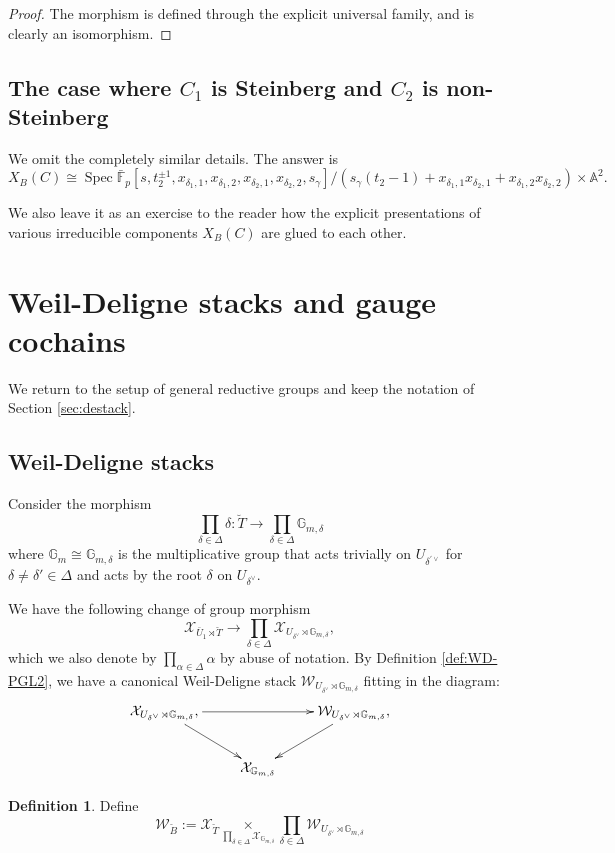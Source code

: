 \documentclass[11pt]{amsart}
\newcommand{\MINOREDITED}[1]{#1}
\theoremstyle{definition}
\newtheorem{defn}[thm]{Definition}
\newcommand{\G}{\mathbb{G}}
\newcommand{\A}{\mathbb{A}}
\newcommand{\bFp}{\bar{\mathbb{F}}_p}
\newcommand{\cX}{\mathcal{X}}
\newcommand{\cW}{\mathcal{W}}
\newcommand{\bB}{\breve{B}}
\newcommand{\bT}{\breve{T}}
\DeclareMathOperator{\Spec}{Spec}
\begin{document}
\begin{proof}
The morphism is defined through the explicit universal
family,
and is clearly an isomorphism.
\end{proof}


\subsection{The case where $C_1$ is Steinberg and
$C_2$ is non-Steinberg}

We omit the completely similar details.
The answer is 
\[
X_{B}(C)
\cong
\Spec \bFp[s,t_2^{\pm1}, x_{\delta_1,1},x_{\delta_1,2},x_{\delta_2,1},x_{\delta_2,2},s_\gamma]
/(s_\gamma(t_2-1)
+ x_{\delta_1,1}x_{\delta_2,1}+x_{\delta_1,2}x_{\delta_2,2})\times \A^2.
\]

We also leave it as an exercise to the reader
how the explicit presentations of various
irreducible components
$X_{B}(C)$ are glued to each other.


\section{Weil-Deligne stacks
and gauge cochains}

We return to the setup of general reductive groups
and keep the notation of Section \ref{sec:destack}.

\subsection{Weil-Deligne stacks}
Consider the morphism
\[
\prod_{\delta\in \Delta}\delta: \bT
\to \prod_{\delta\in \Delta}\G_{m,\delta}
\]
where
$\G_{m}\cong \G_{m,\delta}$
is the multiplicative group
that acts trivially on $U_{\delta^{\prime\vee}}$
for $\delta\neq \delta'\in \Delta$
and acts by the root $\delta$
on $U_{\MINOREDITED{\delta^\vee}}$.

We have the following change of group morphism
\[
\cX_{\bar U_1\rtimes \bT}
\to
\prod_{\delta\in \Delta}\cX_{U_{\delta^\vee}\rtimes \G_{m,\delta}},
\]
which we also denote by $\prod_{\alpha\in \Delta} \alpha$
by abuse of notation.
By Definition \ref{def:WD-PGL2},
we have a canonical Weil-Deligne stack
$\cW_{U_{\delta^\vee}\rtimes \G_{m,\delta}}$
fitting in the diagram:
\[
\xymatrix{
\cX_{U_{\delta^\vee}\rtimes \G_{m,\delta}},
 \ar[rd]\ar[rr] &&
\cW_{U_{\delta^\vee}\rtimes \G_{m,\delta}},
\ar[ld]
\\
& \cX_{\G_{m,\delta}}
}
\]

\begin{defn}
Define
\[
\cW_{\bB} := \cX_{\bT}
\underset{\underset{\delta\in \Delta}{\prod}\cX_{\G_{m,\delta}}}{\times}
\underset{\delta\in \Delta}{\prod}\cW_{U_{\delta^\vee}\rtimes
\G_{m,\delta}}
\]
\end{defn}
\end{document}
